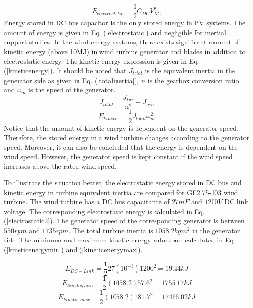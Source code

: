 \begin{equation}
E_{electrostatic}=\frac{1}{2} C_{DC}V_{DC}^{2}
\label{electrostatic}
\end{equation}
Energy stored in DC bus capacitor is the only stored energy in PV systems. The amount of energy is given in Eq. (\ref{electrostatic}) and negligible for inertial support studies. In the wind energy systems, there exists significant amount of kinetic energy (above 10MJ) in wind turbine generator and blades in addition to electrostatic energy. The kinetic energy expression is given in Eq. (\ref{kineticenergy}). It should be noted that $J_{total}$ is the equivalent inertia in the generator side as given in Eq. (\ref{totalinertia}), $n$ is the gearbox conversion ratio and $\omega_{m}$ is the speed of the generator.
\begin{equation}
J_{total}=\frac{J_{tur}}{n^{2}} + J_{gen}
\label{totalinertia}
\end{equation}
\begin{equation}
E_{kinetic}=\frac{1}{2} J_{total}\omega_{m}^{2}
\label{kineticenergy}
\end{equation}
Notice that the amount of kinetic energy is dependent on the generator speed. Therefore, the stored energy in a wind turbine changes according to the generator speed. Moreover, it can also be concluded that the energy is dependent on the wind speed. However, the generator speed is kept constant if the wind speed increases above the rated wind speed. \par
To illustrate the situation better, the electrostatic energy stored in DC bus and kinetic energy in turbine equivalent inertia are compared for GE2.75-103 wind turbine. The wind turbine has a DC bus capacitance of $27mF$ and $1200V$ DC link voltage. The corresponding electrostatic energy is calculated in Eq. (\ref{electrostatic2}). The generator speed of the corresponding generator is between $550rpm$ and $1735rpm$. The total turbine inertia is $1058.2 kgm^2$ in the generator side. The minimum and maximum kinetic energy values are calculated in Eq. (\ref{kineticenergymin}) and (\ref{kineticenergymax}). \par
\begin{equation}
E_{DC-Link}=\frac{1}{2} 27 (10^{-3}) 1200^{2}=19.44kJ
\label{electrostatic2}
\end{equation}
\begin{equation}
E_{kinetic,min}=\frac{1}{2} (1058.2) 57.6^{2}=1755.17kJ
\label{kineticenergymin}
\end{equation}
\begin{equation}
E_{kinetic,max}=\frac{1}{2} (1058.2) 181.7^{2}=17466.02kJ
\label{kineticenergymax}
\end{equation}
